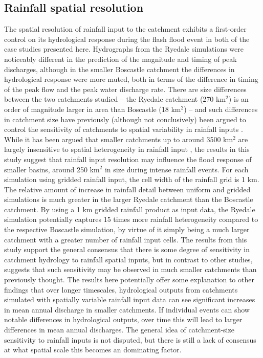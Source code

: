 \subsection{Rainfall spatial resolution}
The spatial resolution of rainfall input to the catchment exhibits a first-order control on its hydrological response during the flash flood event in both of the case studies presented here. Hydrographs from the Ryedale simulations were noticeably different in the prediction of the magnitude and timing of peak discharges, although in the smaller Boscastle catchment the differences in hydrological response were more muted, both in terms of the difference in timing of the peak flow and the peak water discharge rate. There are size differences between the two catchments studied -- the Ryedale catchment (270 km\(^2\)) is an order of magnitude larger in area than Boscastle (18 km\(^2\)) -- and such differences in catchment size have previously (although not conclusively) been argued to control the sensitivity of catchments to spatial variability in rainfall inputs \citep{krajewski1991monte,nicotina2008impact}. While it has been argued that smaller catchments up to around 3500 km\(^2\) are largely insensitive to spatial heterogeneity in rainfall input \citep{nicotina2008impact}, the results in this study suggest that rainfall input resolution may influence the flood response of smaller basins, around 250 km\(^2\) in size during intense rainfall events. For each simulation using gridded rainfall input, the cell width of the rainfall grid is 1 km. The relative amount of increase in rainfall detail between uniform and gridded simulations is much greater in the larger Ryedale catchment than the Boscastle catchment. By using a 1 km gridded rainfall product as input data, the Ryedale simulation potentially captures 15 times more rainfall heterogeneity compared to the respective Boscastle simulation, by virtue of it simply being a much larger catchment with a greater number of rainfall input cells. The results from this study support the general consensus that there is some degree of sensitivity in catchment hydrology to rainfall spatial inputs, but in contrast to other studies, suggests that such sensitivity may be observed in much smaller catchments than previously thought. The results here potentially offer some explanation to other findings that over longer timescales, hydrological outputs from catchments simulated with spatially variable rainfall input data can see significant increases in mean annual discharge \citep{coulthard2016sensitivity} in smaller catchments. If individual events can show notable differences in hydrological outputs, over time this will lead to larger differences in mean annual discharges. The general idea of catchment-size sensitivity to rainfall inputs is not disputed, but there is still a lack of consensus at what spatial scale this becomes an dominating factor. 

